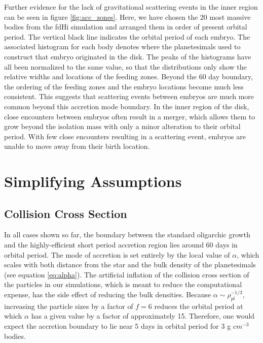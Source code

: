 \documentclass[twocolumn]{aastex63}
\begin{document}
Further evidence for the lack of gravitational scattering events in
the inner region can be seen in figure \ref{fig:acc_zones}. Here, we
have chosen the 20 most massive bodies from the fdHi simulation and
arranged them in order of present orbital period. The vertical black
line indicates the orbital period of each embryo. The associated
histogram for each body denotes where the planetesimals used to
construct that embryo originated in the disk. The peaks of the
histograms have all been normalized to the same value, so that the
distributions only show the relative widths and locations of the
feeding zones. Beyond the 60 day boundary, the ordering of the feeding
zones and the embryo locations become much less consistent. This
suggests that scattering events between embryos are much more common
beyond this accretion mode boundary. In the inner region of the disk,
close encounters between embryos often result in a merger, which
allows them to grow beyond the isolation mass with only a minor alteration to their orbital period. With few close encounters resulting in a scattering event, embryos are unable to move away from their birth location.


\section{Simplifying Assumptions}\label{sec:assump}

\subsection{Collision Cross Section}

In all cases shown so far, the boundary between the standard
oligarchic growth and the highly-efficient short period accretion
region lies around 60 days in orbital period. The mode of accretion is
set entirely by the local value of $\alpha$, which scales with both
distance from the star and the bulk density of the planetesimals (see
equation \ref{eq:alpha}). The artificial inflation of the collision
cross section of the particles in our simulations, which is meant to
reduce the computational expense, has the side effect of reducing the
bulk densities. Because $\alpha \sim \rho_{pl}^{-1/3}$, increasing the
particle sizes by a factor of $f=6$ reduces the orbital period at which $\alpha$ has a given value by a factor of approximately 15. Therefore, one would expect the accretion boundary to lie near 5 days in orbital period for 3 g $cm^{-3}$ bodies.
\end{document}
